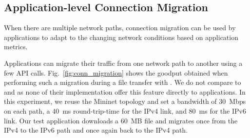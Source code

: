 \subsection{Application-level Connection Migration}
\label{sec:app-migration}

When there are multiple network paths, connection migration can be used by
applications to adapt to the changing network conditions based on application
metrics.

Applications can migrate their traffic from one network path to another using a few \tcpls API calls. Fig.~\ref{fig:conn_migration} shows the goodput obtained when performing such a migration during a file transfer with \tcpls. We do not compare \tcpls to \mptcp and \quic as none of their implementation offer this feature directly to applications. %
In this experiment, we reuse the Mininet topology %
and set a bandwidth of 30~Mbps on each path, a 40~ms round-trip-time for the IPv4 link, and 80~ms for the IPv6 link. Our test application downloads a 60~MB file and migrates once from the IPv4 to the IPv6 path and once again back to the IPv4 path.


